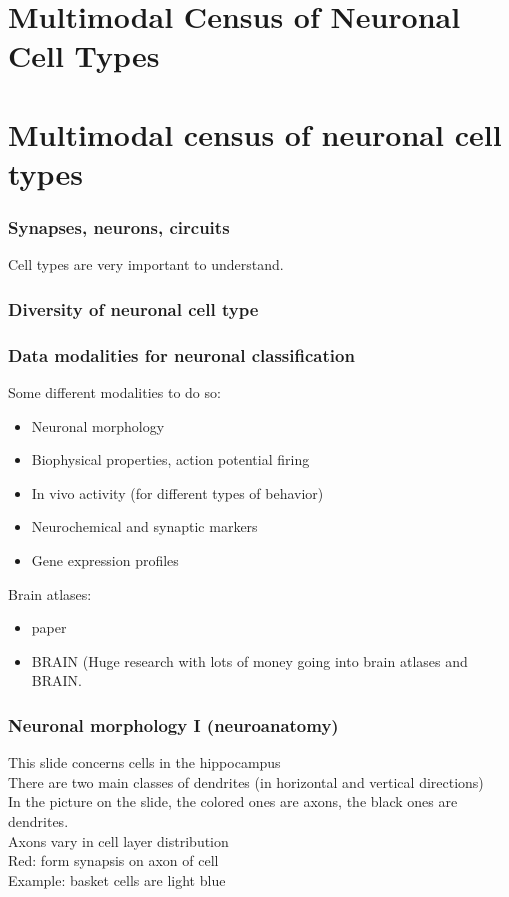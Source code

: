 \begin{itemize}
\begin{itemize}
\section{Multimodal Census of Neuronal Cell Types}

\section{Multimodal census of neuronal cell types}

\subsubsection{Synapses, neurons, circuits}
Cell types are very important to understand.

\subsubsection{Diversity of neuronal cell type}

\subsubsection{Data modalities for neuronal classification}
Some different modalities to do so:
\begin{itemize}
    \item Neuronal morphology
    \item Biophysical properties, action potential firing
    \item In vivo activity (for different types of behavior)
    \item Neurochemical and synaptic markers
    \item Gene expression profiles
\end{itemize}
Brain atlases:
\begin{itemize}
    \item paper
    \item BRAIN (Huge research with lots of money going into brain atlases and BRAIN.
\end{itemize}

\subsubsection{Neuronal morphology I (neuroanatomy)}
This slide concerns cells in the hippocampus
\\There are two main classes of dendrites (in horizontal and vertical directions)
\\In the picture on the slide, the colored ones are axons, the black ones are dendrites.
\\Axons vary in cell layer distribution
\\Red: form synapsis on axon of cell
\\Example: basket cells are light blue


\end{itemize}
\end{itemize}
